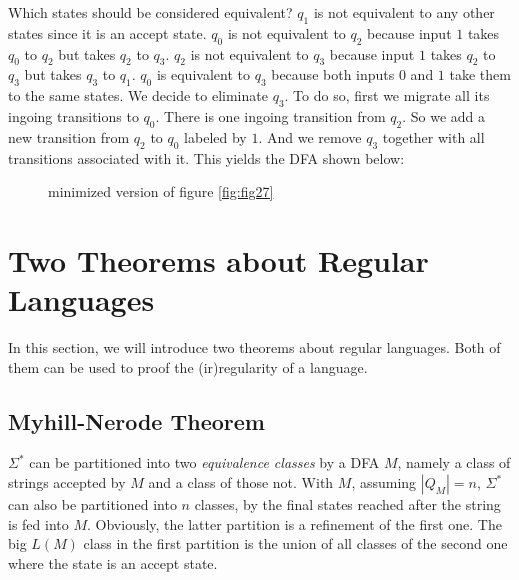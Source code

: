 \documentclass[11pt]{article}
\begin{document}
Which states should be considered equivalent? $q_1$ is not equivalent
to any other states since it is an accept state. $q_0$ is not
equivalent to $q_2$ because input $1$ takes $q_0$ to $q_2$ but takes
$q_2$ to $q_3$. $q_2$ is not equivalent to $q_3$ because input $1$
takes $q_2$ to $q_3$ but takes $q_3$ to $q_1$. $q_0$ is equivalent to
$q_3$ because both inputs $0$ and $1$ take them to the same states.
We decide to eliminate $q_3$. To do so, first we migrate all its
ingoing transitions to $q_0$. There is one ingoing transition from $q_2$.
So we add a new transition from $q_2$ to $q_0$ labeled by $1$. And we
remove $q_3$ together with all transitions associated with it. This
yields the DFA shown below:

\begin{figure}[ht]
    \centering
    \caption{minimized version of figure \ref{fig:fig27}}
    \label{fig:fig28}
\end{figure}

\section{Two Theorems about Regular Languages}

In this section, we will introduce two theorems about regular languages.
Both of them can be used to proof the (ir)regularity of a language.

\subsection{Myhill-Nerode Theorem}

$\Sigma^\ast$ can be partitioned into two \emph{equivalence classes} by
a DFA $M$, namely a class of strings accepted by $M$ and a class of
those not. With $M$, assuming $|Q_M| = n$, $\Sigma^\ast$ can also be
partitioned into $n$ classes, by the final states reached after the string
is fed into $M$. Obviously, the latter partition is a refinement of the
first one. The big $L(M)$ class in the first partition is the union of
all classes of the second one where the state is an accept state.
\end{document}
